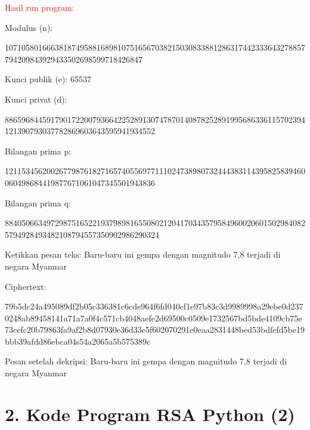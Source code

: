 \documentclass{article}
\begin{document}
\newpage


\textcolor{red}{\huge Hasil run program:}

Modulus (n):

107105801666381874958816898107516567038215030833881286317442333643278857794209843929433502698599718426847

Kunci publik (e): 65537

Kunci privat (d):

886596844591790172200793664225289130747870140878252891995686336115702394121390793037782869603643595941934552

Bilangan prima p:

121153456200267798761827165740556977111024738980732444383114395825839460060498684419877671061047345501943836

Bilangan prima q:

8840506634972987516522193798981655080212041703435795849600206015029840825794928493482108794557350902986290324

Ketikkan pesan teks: Baru-baru ini gempa dengan magnitudo 7,8 terjadi di negara Myanmar

Ciphertext:

79b5dc24a495089df2b05c336381c6cde964f6fd040cf1e97b83c3d9989998a29ebe0d2370248ab89458141a71a7a0f4c571cb4048aefe2d6\n9500c0509e1732567bd5bde4109cb75e73cefc20b79863fa9af2b8d07930e36d33e5f602070291e0eaa2831448bed53bdfefd5be19bbb\nb39afdd86ebca04s54a2065a5b575389c

Pesan setelah dekripsi: Baru-baru ini gempa dengan magnitudo 7,8 terjadi di negara Myanmar

\newpage


\section*{2. Kode Program RSA Python (2)}
\end{document}
